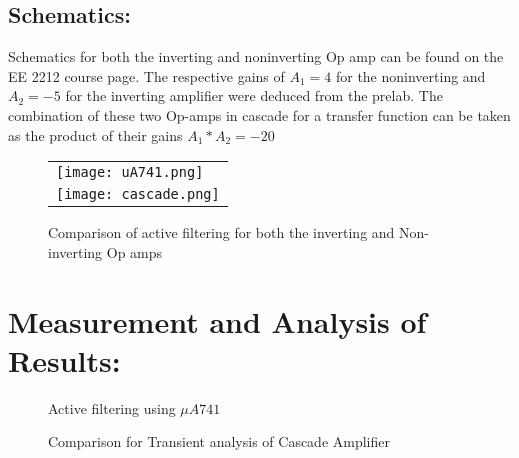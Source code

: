 \documentclass[10pt,a4paper]{article}
\begin{document}
\subsection{Schematics:}



Schematics for both the inverting and noninverting Op amp can be found on the EE 2212 course page. The respective gains of $A_{1}= 4$ for the noninverting and $A_{2}=-5$ for the inverting amplifier were deduced from the prelab. The combination of these two Op-amps in cascade for a transfer function can be taken as the product of their gains $A_{1}*A_{2}= -20$
\begin{figure} [!ht]%
\begin{tabular}{l}
 \texttt{[image: uA741.png]}\\ 
{\texttt{[image: cascade.png]}} \\ 
\end{tabular} 
\end{figure}


\begin{figure}[!ht]%
    \centering
    \qquad
    \caption{Comparison of active filtering for both the inverting and Non-inverting Op amps}%
    \label{fig:example}%
\end{figure}

\pagebreak
\section*{Measurement and Analysis of Results:}

\begin{figure}[!ht]%
    \centering
    \qquad
    \caption{Active filtering using $\mu A741$}%
    \label{fig:example}%
\end{figure}

\begin{figure}[!ht]%
    \centering
    \qquad
    \caption{ Comparison for Transient analysis of Cascade Amplifier }%
    \label{fig 3}%
\end{figure}
\end{document}
